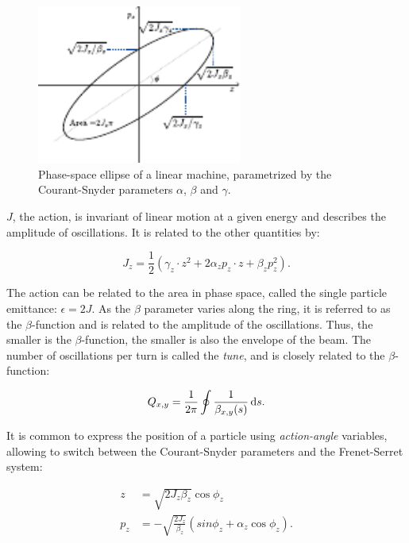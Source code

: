 \begin{figure}[htb]
    \centering
    \includegraphics[width=0.6\textwidth]{images/phase_space.pdf}
    \caption{Phase-space ellipse of a linear machine, parametrized by the Courant-Snyder
    parameters $\alpha$, $\beta$ and $\gamma$.}
    \label{fig:coordinate_systems:twiss}
\end{figure}

$J$, the action, is invariant of linear motion at a given energy and describes the amplitude of 
oscillations. It is related to the other quantities by:

\begin{equation}
    J_z = \frac{1}{2} (\gamma_z \cdot z^2 + 2 \alpha_z p_z \cdot z + \beta_z p_z^2).
    \label{eq:coordinate_systems:action}
\end{equation}

The action can be related to the area in phase space, called the single particle emittance:
$\epsilon = 2J$.  As the $\beta$ parameter varies along the ring, it is referred to as the
$\beta$-function and is related to the amplitude of the oscillations. Thus, the smaller is the
$\beta$-function, the smaller is also the envelope of the beam.
The number of oscillations per turn is called the \textit{tune}, and is closely related to the
$\beta$-function:

\begin{equation}
    Q_{x,y} = \frac{1}{2 \pi} \oint \frac{1}{\beta_{x,y}(s)} \mathop{}\!\mathrm{d} s.
    \label{eq:coordinate_systems:tune}
\end{equation}


It is common to express the position of a particle using \textit{action-angle} variables, allowing
to switch between the Courant-Snyder parameters and the Frenet-Serret system:

\begin{equation}
    \begin{aligned}
    z   &= \sqrt{2J_z \beta_z} \cos{\phi_z} \\
    p_z &= - \sqrt{\frac{2J_z}{\beta_z}} \left( sin{\phi_z} + \alpha_z \cos{\phi_z}\right).
    \end{aligned}
    \label{eq:coordinate_systems:action_angle}
\end{equation}


